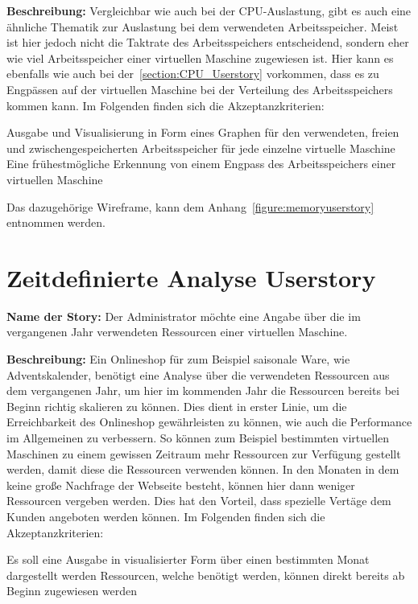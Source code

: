 \textbf{Beschreibung:} Vergleichbar wie auch bei der CPU-Auslastung, gibt es
auch eine ähnliche Thematik zur Auslastung bei dem verwendeten Arbeitsspeicher.
Meist ist hier jedoch nicht die Taktrate des Arbeitsspeichers entscheidend,
sondern eher wie viel Arbeitsspeicher einer virtuellen Maschine zugewiesen ist.
Hier kann es ebenfalls wie auch bei der~\ref{section:CPU_Userstory}
vorkommen, dass es zu Engpässen auf der virtuellen Maschine bei der Verteilung
des Arbeitsspeichers kommen kann. Im Folgenden finden sich die
Akzeptanzkriterien:

\begin{outline}
  \1 Ausgabe und Visualisierung in Form eines Graphen für den verwendeten,
  freien und zwischengespeicherten Arbeitsspeicher für jede einzelne virtuelle
  Maschine
  \1 Eine frühestmögliche Erkennung von einem Engpass des Arbeitsspeichers
  einer virtuellen Maschine
\end{outline}

Das dazugehörige Wireframe, kann dem Anhang~\ref{figure:memoryuserstory}
entnommen werden.
\mr%

\section{Zeitdefinierte Analyse Userstory}
\textbf{Name der Story:} Der Administrator möchte eine Angabe über die im
vergangenen Jahr verwendeten Ressourcen einer virtuellen Maschine.

\textbf{Beschreibung:} Ein Onlineshop für zum Beispiel saisonale Ware, wie
Adventskalender, benötigt eine Analyse über die verwendeten Ressourcen aus dem
vergangenen Jahr, um hier im kommenden Jahr die Ressourcen bereits bei Beginn
richtig skalieren zu können. Dies dient in erster Linie, um die Erreichbarkeit
des Onlineshop gewährleisten zu können, wie auch die Performance im Allgemeinen
zu verbessern. So können zum Beispiel bestimmten virtuellen Maschinen zu einem
gewissen Zeitraum mehr Ressourcen zur Verfügung gestellt werden, damit diese
die Ressourcen verwenden können. In den Monaten in dem keine große Nachfrage
der Webseite besteht, können hier dann weniger Ressourcen vergeben werden. Dies
hat den Vorteil, dass spezielle Vertäge dem Kunden angeboten werden können. Im
Folgenden finden sich die Akzeptanzkriterien:

\begin{outline}
  \1 Es soll eine Ausgabe in visualisierter Form über einen bestimmten Monat
  dargestellt werden
  \1 Ressourcen, welche benötigt werden, können direkt bereits ab Beginn
  zugewiesen werden
\end{outline}

